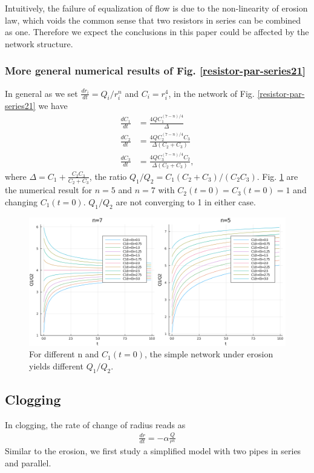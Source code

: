 Intuitively, the failure of equalization of flow is due to the non-linearity of erosion law, which voids the common sense that two resistors in series can be combined as one. Therefore we expect the conclusions in this paper could be affected by the network structure.
\subsubsection{More general numerical results of Fig. \ref{resistor-par-series21}}
In general as we set $\frac{dr_i}{dt} = Q_i/r_i^n$ and $C_i = r_i^4$, in the network of Fig. \ref{resistor-par-series21} we have 
\begin{align}
    \frac{dC_1}{dt} &= \frac{4QC_1^{(7-n)/4}}{\Delta} \\
    \frac{dC_2}{dt} &= \frac{4QC_2^{(7-n)/4}C_3}{\Delta(C_2+C_3)} \\
    \frac{dC_3}{dt} &= \frac{4QC_3^{(7-n)/4}C_2}{\Delta(C_2+C_3)},
\end{align}
where $\Delta = C_1+\frac{C_2C_3}{C_2+C_3}$, the ratio $Q_1/Q_2 = C_1(C_2+C_3)/(C_2C_3)$. Fig. \ref{toy-par-series-eros} are the numerical result for $n=5$ and $n=7$ with $C_2(t=0)=C_3(t=0)=1$ and changing $C_1(t=0)$. $Q_1/Q_2$ are not converging to 1 in either case.  
\begin{figure}[H]
  \centerline{\includegraphics[width=1\textwidth]{Figs/par_series_12.png}}
  \caption{For different n and $C_1(t=0)$, the simple network under erosion yields different $Q_1/Q_2$.}
\label{toy-par-series-eros}
\end{figure}  
\newpage
\subsection{Clogging}
%
In clogging, the rate of change of radius reads as
%
\begin{align}
  \frac{dr}{dt } = -\alpha \frac{Q}{r^{n}} 
\end{align}
%
Similar to the erosion, we first study a simplified model with two
pipes in series and parallel.



